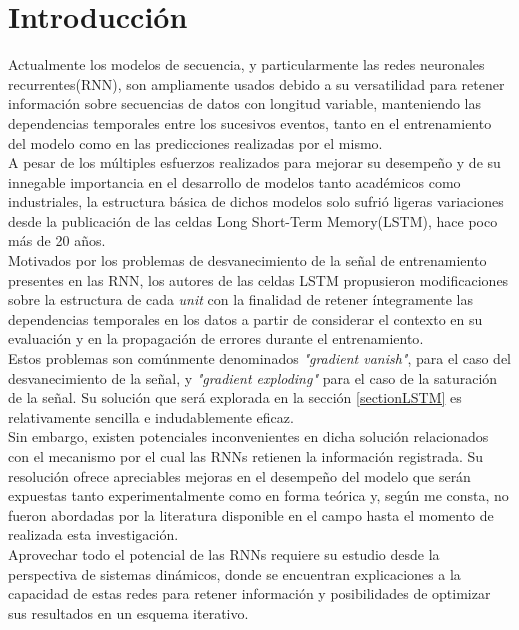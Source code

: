 \documentclass{article}
\begin{document}
	\vspace*{\fill}
	\pagebreak
	
	
	\tableofcontents
	
	\pagebreak
	\section{Introducción}\label{sectionIntroduction}
	
	
	Actualmente los modelos de secuencia, y particularmente las redes neuronales recurrentes(RNN), son ampliamente usados debido a su versatilidad para retener información sobre secuencias de datos con longitud variable, manteniendo las dependencias temporales entre los sucesivos eventos, tanto en el entrenamiento del modelo como en las predicciones realizadas por el mismo.\\
	A pesar de los múltiples esfuerzos realizados para mejorar su desempeño\cite{16ForgateGatePeepholeConnectionsGers} y de su innegable importancia en el desarrollo de modelos tanto académicos\cite{15TransductionGraves} como industriales\cite{12DeepSearch}\cite{13SpeechRecognition}\cite{14RegularizationZaremba}, la estructura básica de dichos modelos solo sufrió ligeras variaciones desde la publicación de las celdas Long Short-Term Memory(LSTM), hace poco más de 20 años. \\
	Motivados por los problemas de desvanecimiento de la señal de entrenamiento presentes en las RNN, los autores de las celdas LSTM propusieron modificaciones sobre la estructura de cada \textit{unit} con la finalidad de retener íntegramente las dependencias temporales en los datos a partir de considerar el contexto en su evaluación y en la propagación de errores durante el entrenamiento\cite{42FormerLSTMHochreiter}.\\
	Estos problemas son comúnmente denominados \textit{"gradient vanish"}, para el caso del desvanecimiento de la señal, y  \textit{"gradient exploding"} para el caso de la saturación de la señal. Su solución que será explorada en la sección \ref{sectionLSTM} es relativamente sencilla e indudablemente eficaz.\\
	
	Sin embargo, existen potenciales inconvenientes en dicha solución relacionados con el mecanismo por el cual las RNNs retienen la información registrada. Su resolución ofrece apreciables mejoras en el desempeño del modelo que serán expuestas tanto experimentalmente como en forma teórica y, según me consta, no fueron abordadas por la literatura disponible en el campo hasta el momento de realizada esta investigación.\\
	Aprovechar todo el potencial de las RNNs requiere su estudio desde la perspectiva de sistemas dinámicos, donde se encuentran explicaciones a la capacidad de estas redes para retener información y posibilidades de optimizar sus resultados en un esquema iterativo.\\
	
\end{document}
